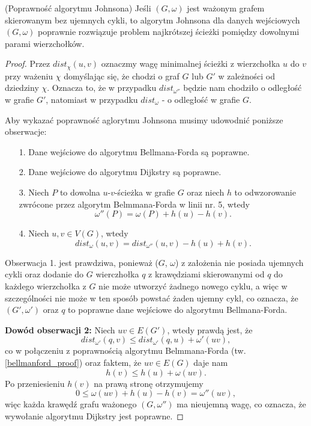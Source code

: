 \begin{theorem}{(Poprawność algorytmu Johnsona)}
	Jeśli $(G, \omega)$ jest ważonym grafem skierowanym
	bez ujemnych cykli, to algorytm Johnsona dla 
	danych wejściowych $(G, \omega)$ poprawnie
	rozwiązuje problem najkrótszej ścieżki 
	pomiędzy dowolnymi parami wierzchołków.
	
	\begin{proof}
		Przez $dist_\chi(u, v)$ oznaczmy wagę minimalnej ścieżki
		z wierzchołka $u$ do $v$ przy ważeniu $\chi$ domyślając się, 
		że chodzi o graf $G$ lub $G'$ w zależności od dziedziny $\chi$. Oznacza to, że w przypadku $dist_{\omega''}$ będzie nam chodziło o odległość w grafie $G'$,
		natomiast w przypadku $dist_{\omega}$ - o odległość w grafie $G$.
		
		Aby wykazać poprawność aglorytmu Johnsona 
		musimy udowodnić poniższe obserwacje:
		\begin{itemize}
			\item[1. ] Dane wejściowe do 
			algorytmu Bellmana-Forda są poprawne.
			\item[2. ] Dane wejściowe do 
			algorytmu Dijkstry są poprawne.
			\item[3. ] Niech $P$ to dowolna
			$u$-$v$-ścieżka w grafie $G$ oraz niech $h$
			to odwzorowanie zwrócone przez algorytm
			Belmmana-Forda w linii nr. 5, wtedy
			\[\omega''(P) = \omega(P) +  h(u) - h(v).\]
			\item[4. ] Niech $u, v \in V(G)$, wtedy
			\[dist_{\omega}(u, v) = dist_{\omega''}(u, v) - h(u) + h(v).\]
		\end{itemize}
		
		Obserwacja 1. jest prawdziwa, ponieważ ($G$, $\omega$)
		z założenia nie posiada ujemnych cykli oraz
		dodanie do $G$ wierczhołka $q$ z krawędziami skierowanymi
		od $q$ do każdego wierzchołka z $G$ nie może utworzyć
		żadnego nowego cyklu, a więc w szczególności nie może
		w ten sposób powstać żaden ujemny cykl, co oznacza, że
		$(G', \omega')$ oraz $q$ to poprawne dane wejściowe
		do algorytmu Bellmana-Forda.
		
		\textbf{Dowód obserwacji 2:} Niech $uv \in E(G')$, 
		wtedy prawdą jest, że
		\[dist_{\omega'}(q, v) \leq dist_{\omega'}(q, u) + \omega'(uv),\]
		co w połączeniu z poprawnością algorytmu Belmmana-Forda (tw.
		\ref{bellmanford_proof}) oraz faktem, że 
		$uv \in E(G)$ daje nam
		\[h(v) \leq h(u) + \omega(uv).\]
		Po przeniesieniu $h(v)$ na prawą stronę otrzymujemy 
		\[0 \leq \omega(uv) + h(u) - h(v) = \omega''(uv),\]
		więc każda krawędź grafu ważonego $(G, \omega'')$ ma
		nieujemną wagę, co oznacza, że wywołanie algorytmu 
		Dijkstry jest poprawne.  
		

\end{proof}
\end{theorem}
